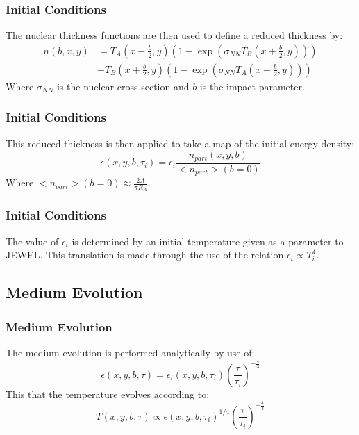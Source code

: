\documentclass{beamer}
\begin{document}
\begin{frame}\frametitle{Initial Conditions}
	The nuclear thickness functions are then used to define a reduced thickness by:
	\begin{equation}
	\begin{split}
	n(b,x,y) &= T_A(x-\frac{b}{2},y) \left( 1-\exp\left( \sigma_{NN} T_B(x+\frac{b}{2},y) \right) \right) \\
	&+ T_B(x+\frac{b}{2},y) \left( 1-\exp\left( \sigma_{NN} T_A(x-\frac{b}{2},y) \right) \right)
	\end{split}
	\end{equation}
	Where $\sigma_{NN}$ is the nuclear cross-section and $b$ is the impact parameter.
\end{frame}

\begin{frame}\frametitle{Initial Conditions}
	This reduced thickness is then applied to take a map of the initial energy density:
	\begin{equation}
	\epsilon(x,y,b,\tau_i) = \epsilon_i \frac{n_{part}(x,y,b)}{<n_{part}>(b=0)}
	\end{equation}
	Where $<n_{part}>(b=0) \approx \frac{2 A}{\pi R_A}$.
\end{frame}

\begin{frame}\frametitle{Initial Conditions}
	The value of $\epsilon_i$ is determined by an initial temperature given as a parameter to
	JEWEL. This translation is made through the use of the relation $\epsilon_i \propto T_i^4$.
\end{frame}

\subsection{Medium Evolution}

\begin{frame}\frametitle{Medium Evolution}
	The medium evolution is performed analytically by use of:
	\begin{equation}
	\epsilon(x,y,b,\tau) = \epsilon_i (x,y,b,\tau_i) \left( \frac{\tau}{\tau_i} \right)^{-\frac{4}{3}}
	\end{equation}
	\pause
	This that the temperature evolves according to:
	\begin{equation}
	T(x,y,b,\tau) \propto \epsilon(x,y,b,\tau_i)^{1/4} \left( \frac{\tau}{\tau_i} \right)^{-\frac{4}{3}}
	\end{equation}
\end{frame}
\end{document}
